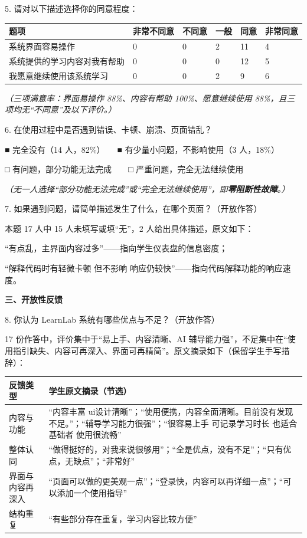 \documentclass[zihao=-4,a4paper,UTF8,fontset=windows]{ctexart}
\begin{document}
5. 请对以下描述选择你的同意程度：

{\setlength{\tabcolsep}{3pt}
\par\noindent\begin{tabular}{|p{5.2cm}|p{1.7cm}|p{1.7cm}|p{1.7cm}|p{1.7cm}|p{1.7cm}|}
\hline
\textbf{题项} & \textbf{非常不同意} & \textbf{不同意} & \textbf{一般} & \textbf{同意} & \textbf{非常同意} \\ \hline
系统界面容易操作 & 0 & 0 & 2 & 11 & 4 \\ \hline
系统提供的学习内容对我有帮助 & 0 & 0 & 0 & 12 & 5 \\ \hline
我愿意继续使用该系统学习 & 0 & 0 & 2 & 9 & 6 \\ \hline
\end{tabular}\par}

\textit{（三项满意率：界面易操作 88\%、内容有帮助 100\%、愿意继续使用 88\%，且三项均无“不同意”及以下评价。）}

6. 在使用过程中是否遇到错误、卡顿、崩溃、页面错乱？

■ 完全没有（14 人，82\%）　　■ 有少量小问题，不影响使用（3 人，18\%）

□ 有问题，部分功能无法完成　　□ 严重问题，完全无法继续使用

\textit{（无一人选择“部分功能无法完成”或“完全无法继续使用”，即\textbf{零阻断性故障}。）}

7. 如果遇到问题，请简单描述发生了什么，在哪个页面？（开放作答）

本题 17 人中 15 人未填写或填“无”，2 人给出具体描述，原文如下：

“有点乱，主界面内容过多”——指向学生仪表盘的信息密度；

“解释代码时有轻微卡顿 但不影响 响应仍较快”——指向代码解释功能的响应速度。

\textbf{三、开放性反馈}

8. 你认为 LearnLab 系统有哪些优点与不足？（开放作答）

17 份作答中，评价集中于“易上手、内容清晰、AI 辅导能力强”，不足集中在“使用指引缺失、内容可再深入、界面可再精简”。原文摘录如下（保留学生手写措辞）：

{\setlength{\tabcolsep}{4pt}
\par\noindent\begin{tabular}{|p{2.6cm}|p{10.8cm}|}
\hline
\textbf{反馈类型} & \textbf{学生原文摘录（节选）} \\ \hline
内容与功能 & “内容丰富 ui设计清晰”；“使用便携，内容全面清晰。目前没有发现不足。”；“辅导学习能力很强”；“很容易上手 可记录学习时长 也适合基础者 使用很流畅” \\ \hline
整体认同 & “做得挺好的，对我来说很够用”；“全是优点，没有不足”；“只有优点，无缺点”；“非常好” \\ \hline
界面与内容再深入 & “页面可以做的更美观一点”；“登录快，内容可以再详细一点”；“可以添加一个使用指导” \\ \hline
结构重复 & “有些部分存在重复，学习内容比较方便” \\ \hline
\end{tabular}\par}
\end{document}
